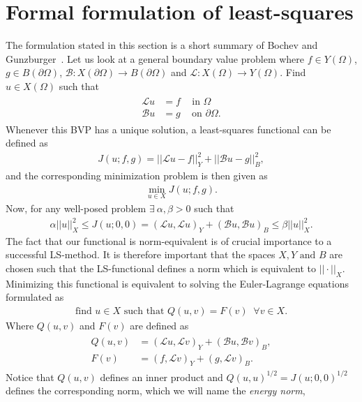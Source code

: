 \section{Formal formulation of least-squares}
The formulation stated in this section is a short summary of Bochev and Gunzburger~\cite{Bochev}.
Let us look at a general boundary value problem where $f \in Y(\Omega)$, $g \in B(\partial \Omega)$, $\mathcal{B}\colon X(\partial \Omega) \to B(\partial\Omega) $ and $\mathcal{L}\colon X(\Omega)\to Y(\Omega)$. Find $u \in X(\Omega) $ such that 
\begin{align}
	\begin{split}
	\mathcal{L} u &= f \; \; \; \text{ in } \Omega \\
	\mathcal{B}u &= g \; \; \; \text{ on } \partial \Omega.
	\end{split}
	\label{eq:BVP}
\end{align}
Whenever this BVP has a unique solution, a least-squares functional can be defined as 
\begin{align}
	J(u;f,g) = ||\mathcal{L}u-f||^2_Y + ||\mathcal{B}u-g||^2_B,
	\label{eq:FunctionalGen}
\end{align}
and the corresponding minimization problem is then given as 
\begin{align}
	\min_{u \in X}J(u;f,g).
	\label{eq:minProbGen}
\end{align}
Now, for any well-posed problem $\exists \: \alpha,\beta > 0$ such that 
\begin{align}
	\alpha||u||_X^2 \leq J(u;0,0) = (\mathcal{L}u,\mathcal{L}u)_Y+(\mathcal{B}u,\mathcal{B}u)_B \leq \beta||u||_X^2.
	\label{eq:normEq}
\end{align}
The fact that our functional is norm-equivalent is of crucial importance to a successful LS-method. It is therefore important that the spaces $X,Y \text{ and } B$ are chosen such that the LS-functional defines a norm which is equivalent to $|| \cdot ||_X$.
Minimizing this functional is equivalent to solving the Euler-Lagrange equations formulated as 
\begin{align}
	\text{find } u \in X \text{  such that  } Q(u,v) = F(v) \; \; \forall v\in X.
	\label{eq:varFormGen}
\end{align}
Where $Q(u,v)$ and $F(v)$ are defined as 
\begin{align}
	\begin{split}
	Q(u,v) &= (\mathcal{L}u,\mathcal{L}v)_Y+(\mathcal{B}u,\mathcal{B}v)_B, \\
	F(v) &= (f,\mathcal{L}v)_Y+(g,\mathcal{L}v)_B.
	\end{split}
	\label{eq:VarFormLinForms}
\end{align}
%
Notice that $Q(u,v)$ defines an inner product and $Q(u,u)^{1/2}=J(u;0,0)^{1/2}$ defines the corresponding norm, which we will name the \textit{energy norm},

